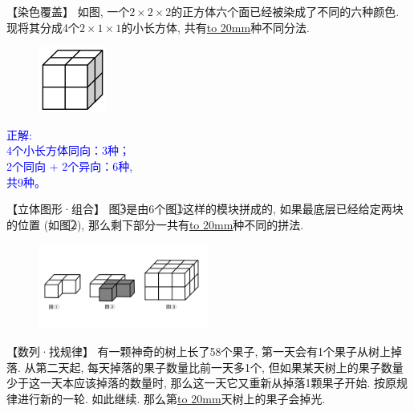 \item {
    【染色覆盖】
    如图, 一个$2\times 2\times 2$的正方体六个面已经被染成了不同的六种颜色. 现将其分成4个$2\times 1\times 1$的小长方体, 共有\underline{\hbox to 20mm{}}种不同分法.
    \begin{figure}[H] 
        \centering
        \includegraphics[width=0.2\textwidth]{./pics/Chapter_4/15.png}
    \end{figure}
    \ifshowSolution 
        \fangsong{}\textcolor{blue}{
            正解: \\
            4个小长方体同向：3种；\\
            2个同向 + 2个异向：6种,\\
            共9种。
        }
    \else
        \vspace{1cm}
    \fi
}

\item {
    【立体图形·组合】
    图\textcircled{3}是由6个图\textcircled{1}这样的模块拼成的, 如果最底层已经给定两块的位置 (如图\textcircled{2}), 那么剩下部分一共有\underline{\hbox to 20mm{}}种不同的拼法.
    \begin{figure}[H] 
        \centering
        \includegraphics[width=0.5\textwidth]{./pics/Chapter_4/2016_2.png}
    \end{figure}
}

\item {
    【数列·找规律】
    有一颗神奇的树上长了58个果子, 第一天会有1个果子从树上掉落. 从第二天起, 每天掉落的果子数量比前一天多1个, 但如果某天树上的果子数量少于这一天本应该掉落的数量时, 那么这一天它又重新从掉落1颗果子开始. 按原规律进行新的一轮. 如此继续. 那么第\underline{\hbox to 20mm{}}天树上的果子会掉光.
    \vspace{1cm}
}

